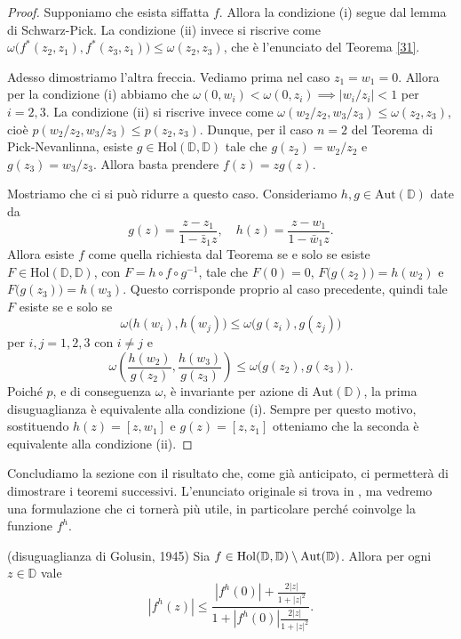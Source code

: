 \begin{proof}
  Supponiamo che esista siffatta $f$. Allora la condizione (i) segue dal lemma di Schwarz-Pick. La condizione (ii) invece si riscrive come $\omega\bigl(f^*(z_2,z_1),f^*(z_3,z_1)\bigr) \le \omega(z_2,z_3)$, che è l'enunciato del Teorema \ref{31}.

  Adesso dimostriamo l'altra freccia. Vediamo prima nel caso $z_1=w_1=0$. Allora per la condizione (i) abbiamo che $\omega(0,w_i) < \omega(0,z_i) \implies |w_i/z_i|<1$ per $i=2,3$. La condizione (ii) si riscrive invece come $\omega(w_2/z_2,w_3/z_3) \le \omega(z_2,z_3)$, cioè $p(w_2/z_2,w_3/z_3) \le p(z_2,z_3)$.
  Dunque, per il caso $n=2$ del Teorema di Pick-Nevanlinna, esiste $g \in \text{Hol}(\mathbb{D},\mathbb{D})$ tale che $g(z_2)=w_2/z_2$ e $g(z_3)=w_3/z_3$. Allora basta prendere $f(z)=zg(z)$.

   Mostriamo che ci si può ridurre a questo caso. Consideriamo $h, g \in \text{Aut}(\mathbb{D})$ date da
   $$g(z)=\frac{z-z_1}{1-\bar{z}_1z}, \quad h(z)=\frac{z-w_1}{1-\bar{w}_1z}.$$
   Allora esiste $f$ come quella richiesta dal Teorema se e solo se esiste $F \in \text{Hol}(\mathbb{D},\mathbb{D})$, con $F=h \circ f \circ g^{-1}$, tale che $F(0)=0$, $F\bigl(g(z_2)\bigr)=h(w_2)$ e $F\bigl(g(z_3)\bigr)=h(w_3)$.
   Questo corrisponde proprio al caso precedente, quindi tale $F$ esiste se e solo se
   $$\omega\bigl(h(w_i),h(w_j)\bigr) \le \omega\bigl(g(z_i),g(z_j)\bigr)$$
   per $i,j=1,2,3$ con $i\not=j$ e
   $$\omega\left(\frac{h(w_2)}{g(z_2)},\frac{h(w_3)}{g(z_3)}\right) \le \omega\bigl(g(z_2),g(z_3)\bigr).$$
   Poiché $p$, e di conseguenza $\omega$, è invariante per azione di $\text{Aut}(\mathbb{D})$, la prima disuguaglianza è equivalente alla condizione (i). Sempre per questo motivo, sostituendo $h(z)=[z,w_1]$ e $g(z)=[z,z_1]$ otteniamo che la seconda è equivalente alla condizione (ii).
\end{proof}

Concludiamo la sezione con il risultato che, come già anticipato, ci permetterà di dimostrare i teoremi successivi. L'enunciato originale si trova in \cite{GMG}, ma vedremo una formulazione che ci tornerà più utile, in particolare perché coinvolge la funzione $f^h$.

\begin{thm} \label{golusin}
  (disuguaglianza di Golusin, 1945) Sia $f \in \text{\normalfont{Hol}}(\mathbb{D},\mathbb{D})\setminus\text{\normalfont{Aut}}(\mathbb{D})$. Allora per ogni $z \in \mathbb{D}$ vale
  \begin{equation} \label{gol}
    |f^h(z)| \le \frac{|f^h(0)|+\frac{2|z|}{1+|z|^2}}{1+|f^h(0)|\frac{2|z|}{1+|z|^2}}.
  \end{equation}
\end{thm}

